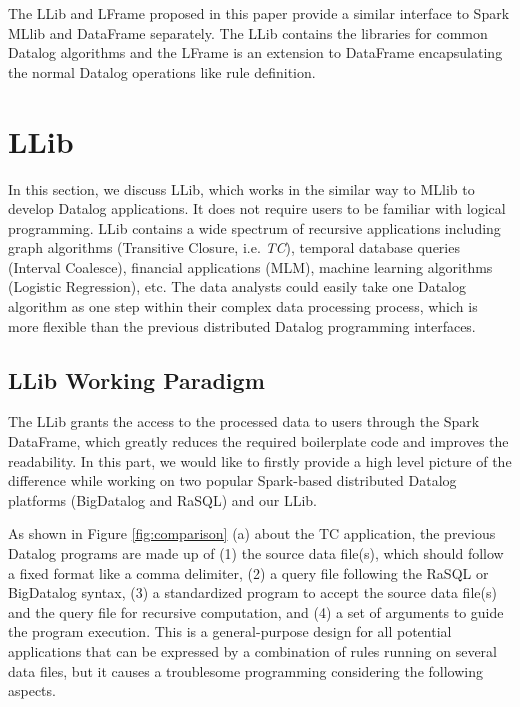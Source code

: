 The LLib and LFrame proposed in this paper provide a similar interface to Spark MLlib and DataFrame separately. The LLib contains the libraries for common Datalog algorithms and the LFrame is an extension to DataFrame encapsulating the normal Datalog operations like rule definition. 

\section{LLib}
\label{llib}
In this section, we discuss LLib, which works in the similar way to MLlib to develop Datalog applications. It does not require  users to be familiar with logical programming. LLib contains a wide spectrum of recursive applications including graph algorithms (Transitive Closure, i.e. \textit{TC}), temporal database queries (Interval Coalesce), financial applications (MLM),  machine learning algorithms (Logistic Regression), etc. 
The data analysts could easily take one Datalog algorithm as one step within their complex data processing process, which is more flexible than the previous distributed Datalog programming interfaces. 











\subsection{LLib Working Paradigm}
\label{sec:paradigm}

The LLib grants the access to the processed data to users through the Spark DataFrame, which greatly reduces the required boilerplate code and improves  the readability. In this part, we would like to firstly provide a high level picture of the difference while working on two popular Spark-based distributed Datalog platforms (BigDatalog and RaSQL) and our LLib. 

As shown in Figure \ref{fig:comparison} (a) about the TC application, the previous Datalog programs are made up of (1) the  source data file(s), which should follow a fixed format like a comma delimiter, (2) a query file following the RaSQL or BigDatalog syntax, (3) a standardized program to accept the source data file(s) and the query file for recursive computation, and (4) a set of arguments to guide the program execution. This is a general-purpose design for all potential applications that can be expressed by a combination of rules running on several data files, but it causes a troublesome programming considering the following aspects.


